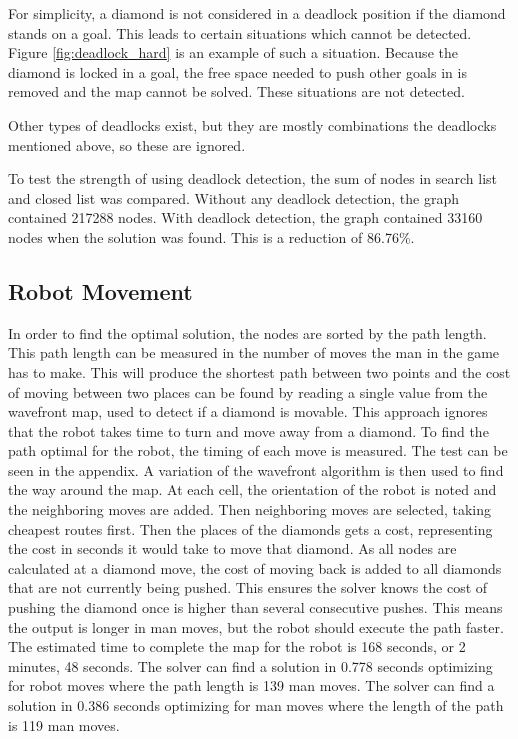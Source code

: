 For simplicity, a diamond is not considered in a deadlock position if the diamond stands on a goal.
This leads to certain situations which cannot be detected.
Figure \ref{fig:deadlock_hard} is an example of such a situation.
Because the diamond is locked in a goal, the free space needed to push other goals in is removed and the map cannot be solved.
These situations are not detected.

Other types of deadlocks exist, but they are mostly combinations the deadlocks mentioned above, so these are ignored.


To test the strength of using deadlock detection, the sum of nodes in search list and closed list was compared.
Without any deadlock detection, the graph contained 217288 nodes.
With deadlock detection, the graph contained 33160 nodes when the solution was found.
This is a reduction of 86.76\%. 

\subsection{Robot Movement}
In order to find the optimal solution, the nodes are sorted by the path length.
This path length can be measured in the number of moves the man in the game has to make.
This will produce the shortest path between two points and the cost of moving between two places can be found by reading a single value from the wavefront map, used to detect if a diamond is movable.
This approach ignores that the robot takes time to turn and move away from a diamond.
To find the path optimal for the robot, the timing of each move is measured.
The test can be seen in the appendix.
A variation of the wavefront algorithm is then used to find the way around the map.
At each cell, the orientation of the robot is noted and the neighboring moves are added.
Then neighboring moves are selected, taking cheapest routes first.
Then the places of the diamonds gets a cost, representing the cost in seconds it would take to move that diamond.
As all nodes are calculated at a diamond move, the cost of moving back is added to all diamonds that are not currently being pushed.
This ensures the solver knows the cost of pushing the diamond once is higher than several consecutive pushes. 
This means the output is longer in man moves, but the robot should execute the path faster.
The estimated time to complete the map for the robot is 168 seconds, or 2 minutes, 48 seconds.
The solver can find a solution in 0.778 seconds optimizing for robot moves where the path length is 139 man moves.
The solver can find a solution in 0.386 seconds optimizing for man moves where the length of the path is 119 man moves.

